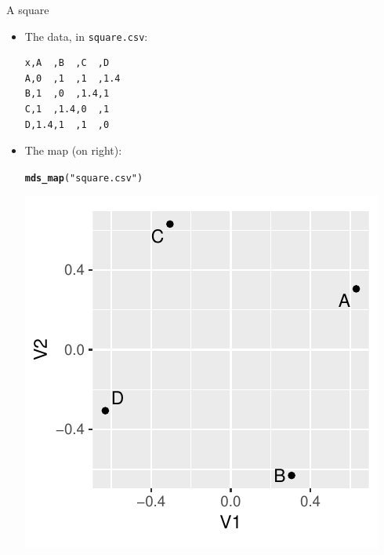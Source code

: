 \documentclass[unknownkeysallowed]{beamer}\usepackage[]{graphicx}\usepackage[]{color}
\makeatletter
\def\maxwidth{ %
  \ifdim\Gin@nat@width>\linewidth
    \linewidth
  \else
    \Gin@nat@width
  \fi
}
\newcommand{\hlstr}[1]{\textcolor[rgb]{0.192,0.494,0.8}{#1}}%
\newcommand{\hlstd}[1]{\textcolor[rgb]{0.345,0.345,0.345}{#1}}%
\newcommand{\hlkwd}[1]{\textcolor[rgb]{0.737,0.353,0.396}{\textbf{#1}}}%
\newenvironment{kframe}{%
 \def\at@end@of@kframe{}%
 \ifinner\ifhmode%
  \def\at@end@of@kframe{\end{minipage}}%
  \begin{minipage}{\columnwidth}%
 \fi\fi%
 \def\FrameCommand##1{\hskip\@totalleftmargin \hskip-\fboxsep
 \colorbox{shadecolor}{##1}\hskip-\fboxsep
     \hskip-\linewidth \hskip-\@totalleftmargin \hskip\columnwidth}%
 \MakeFramed {\advance\hsize-\width
   \@totalleftmargin\z@ \linewidth\hsize
   \@setminipage}}%
 {\par\unskip\endMakeFramed%
 \at@end@of@kframe}
\newenvironment{knitrout}{}{} %
\makeatother
\begin{document}
\begin{frame}[fragile]{A square}
  
  \begin{multicols}{2}
  \begin{itemize}
  \item The data, in \texttt{square.csv}:
    
\begin{small}
\begin{verbatim}
x,A  ,B  ,C  ,D
A,0  ,1  ,1  ,1.4
B,1  ,0  ,1.4,1
C,1  ,1.4,0  ,1
D,1.4,1  ,1  ,0
\end{verbatim}
\end{small}
    
    \item The map (on right):
      
\begin{knitrout}
\color{fgcolor}\begin{kframe}
\begin{alltt}
\hlkwd{mds_map}\hlstd{(}\hlstr{"square.csv"}\hlstd{)}
\end{alltt}
\end{kframe}
\includegraphics[width=\maxwidth]{figure/unnamed-chunk-391-1} 

\end{knitrout}
  \end{itemize}
    
  \end{multicols}
  
\end{frame}
\end{document}
